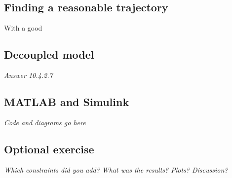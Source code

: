 \documentclass[../main.tex]{subfiles}
\begin{document}
\subsection{Finding a reasonable trajectory}
With a good
 






\subsection{Decoupled model}
\textit{Answer 10.4.2.7}

\subsection{MATLAB and Simulink}
\textit{Code and diagrams go here}

\subsection{Optional exercise}
\textit{Which constraints did you add? What was the results? Plots? Discussion?}
\end{document}
